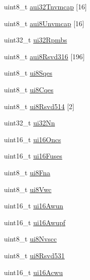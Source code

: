 \begin{DoxyCompactItemize}
\item 
uint8\+\_\+t \mbox{\hyperlink{struct__ni__nvme__identify_a6ad5a3ac7a28dce6bffe036cc1e3b3e3}{aui32\+Tnvmcap}} \mbox{[}16\mbox{]}
\item 
uint8\+\_\+t \mbox{\hyperlink{struct__ni__nvme__identify_a679641054faea1bc2fae77a9ad0ac434}{aui8\+Unvmcap}} \mbox{[}16\mbox{]}
\item 
uint32\+\_\+t \mbox{\hyperlink{struct__ni__nvme__identify_a509c2c20f1bb1d5bde53cf1a9270ea3b}{ui32\+Rpmbs}}
\item 
uint8\+\_\+t \mbox{\hyperlink{struct__ni__nvme__identify_a46f5990eed5c27fcbfb87dd9a8f49fc2}{aui8\+Rsvd316}} \mbox{[}196\mbox{]}
\item 
uint8\+\_\+t \mbox{\hyperlink{struct__ni__nvme__identify_a94e9dd39203fc30fc7673aef38e4fbdc}{ui8\+Sqes}}
\item 
uint8\+\_\+t \mbox{\hyperlink{struct__ni__nvme__identify_ae9e2c8ccb1d153fddb8485c2bbba9791}{ui8\+Cqes}}
\item 
uint8\+\_\+t \mbox{\hyperlink{struct__ni__nvme__identify_a579793396b1aaf6b9d87cc7a0042209b}{ui8\+Rsvd514}} \mbox{[}2\mbox{]}
\item 
uint32\+\_\+t \mbox{\hyperlink{struct__ni__nvme__identify_a425569273c4251f3800a5c80cd20dc77}{ui32\+Nn}}
\item 
uint16\+\_\+t \mbox{\hyperlink{struct__ni__nvme__identify_ae99dfe995a0e7b7f3ab70b579f951e9a}{ui16\+Oncs}}
\item 
uint16\+\_\+t \mbox{\hyperlink{struct__ni__nvme__identify_ad8ae14b16fa780e4f4f13d229f67e28b}{ui16\+Fuses}}
\item 
uint8\+\_\+t \mbox{\hyperlink{struct__ni__nvme__identify_a66b510fdd4824cfc9dc6de5909105c9a}{ui8\+Fna}}
\item 
uint8\+\_\+t \mbox{\hyperlink{struct__ni__nvme__identify_aefdf079892ba329597fefc34f4ccdb0a}{ui8\+Vwc}}
\item 
uint16\+\_\+t \mbox{\hyperlink{struct__ni__nvme__identify_a9ea376bcaaf96f695fb109f51038c861}{ui16\+Awun}}
\item 
uint16\+\_\+t \mbox{\hyperlink{struct__ni__nvme__identify_aa158993f4691b09428b6b8eb14478a06}{ui16\+Awupf}}
\item 
uint8\+\_\+t \mbox{\hyperlink{struct__ni__nvme__identify_a27f275b39265201a78d434c2d6f07415}{ui8\+Nvscc}}
\item 
uint8\+\_\+t \mbox{\hyperlink{struct__ni__nvme__identify_a76b0550edea47be381e6f42972fc8c64}{ui8\+Rsvd531}}
\item 
uint16\+\_\+t \mbox{\hyperlink{struct__ni__nvme__identify_a004b3ca9a13679eb5f0e2bd765832e05}{ui16\+Acwu}}

\end{DoxyCompactItemize}
